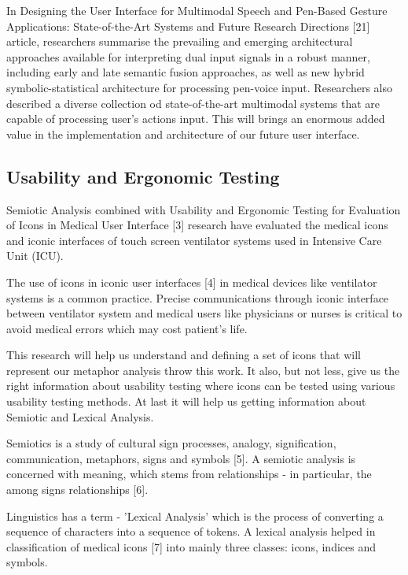 In Designing the User Interface for Multimodal Speech and Pen-Based Gesture Applications: State-of-the-Art Systems and Future Research Directions [21] article, researchers summarise the prevailing and emerging architectural approaches available for interpreting dual input signals in a robust manner, including early and late semantic fusion approaches, as well as new hybrid symbolic-statistical architecture for processing pen-voice input. Researchers also described a diverse collection od state-of-the-art multimodal systems that are capable of processing user's actions input. This will brings an enormous added value in the implementation and architecture of our future user interface.



\subsection{Usability and Ergonomic Testing}

Semiotic Analysis combined with Usability and Ergonomic Testing for Evaluation of Icons in Medical User Interface [3] research have evaluated the medical icons and iconic interfaces of touch screen ventilator systems used in Intensive Care Unit (ICU).

The use of icons in iconic user interfaces [4] in medical devices like ventilator systems is a common practice. Precise communications through iconic interface between ventilator system and medical users like physicians or nurses is critical to avoid medical errors which may cost patient's life.

This research will help us understand and defining a set of icons that will represent our metaphor analysis throw this work. It also, but not less, give us the right information about usability testing where icons can be tested using various usability testing methods. At last it will help us getting information about Semiotic and Lexical Analysis.

Semiotics is a study of cultural sign processes, analogy, signification, communication, metaphors, signs and symbols [5]. A semiotic analysis is concerned with meaning, which stems from relationships - in particular, the among signs relationships [6].

Linguistics has a term - 'Lexical Analysis' which is the process of converting a sequence of characters into a sequence of tokens. A lexical analysis helped in classification of medical icons [7] into mainly three classes: icons, indices and symbols.

